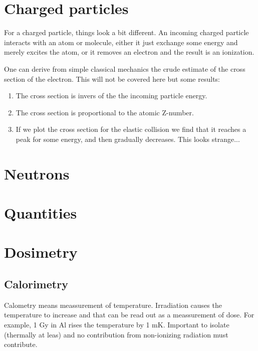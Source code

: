 \documentclass{article}
\begin{document}
\section{Charged particles}

For a charged particle, things look a bit different.
An incoming charged particle interacts with an atom or molecule, either it just exchange some energy and merely excites the atom, or it removes an electron and the result is an ionization.

One can derive from simple classical mechanics the crude estimate of the cross section of the electron.
This will not be covered here but some results:

\begin{enumerate}

	\item
		The cross section is invers of the the incoming particle energy. 

	\item
		The cross section is proportional to the atomic Z-number.

	\item

		If we plot the cross section for the elastic collision we find that it reaches a peak for some energy, and then gradually decreases. 
		This looks strange...

\end{enumerate}







\section{Neutrons}

\section{Quantities}

\section{Dosimetry}

\subsection{Calorimetry}

Calometry means meassurement of temperature. 
Irradiation causes the temperature to increase and that can be read out as a meassurement of dose.
For example, 1 Gy in Al rises the temperature by 1 mK.
Important to isolate (thermally at leas) and no contribution from non-ionizing radiation must contribute.
\end{document}
